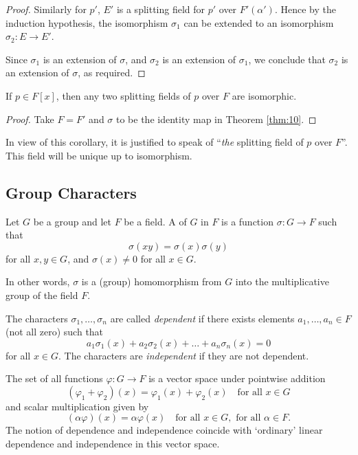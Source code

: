 \begin{theorem}
\begin{proof}
		Similarly for $p'$, $E'$ is a splitting field for $p'$ over $F'(\alpha')$. Hence by the induction hypothesis, the isomorphism $\sigma_1$ can be extended to an isomorphism $\sigma_2 : E \to E'$.
		
		Since $\sigma_1$ is an extension of $\sigma$, and $\sigma_2$ is an extension of $\sigma_1$, we conclude that $\sigma_2$ is an extension of $\sigma$, as required.
	\end{proof}
\end{theorem}

\begin{corollary}
	If $p \in F[x]$, then any two splitting fields of $p$ over $F$ are isomorphic.
	\begin{proof}
		Take $F = F'$ and $\sigma$ to be the identity map in Theorem \ref{thm:10}.
	\end{proof}
\end{corollary}

In view of this corollary, it is justified to speak of ``\emph{the} splitting field of $p$ over $F$''. This field will be unique up to isomorphism.

\subsection{Group Characters}
\begin{definition}
	Let $G$ be a group and let $F$ be a field. A  of $G$ in $F$ is a function $\sigma : G \to F$ such that
	\[
		\sigma(xy) = \sigma(x) \sigma(y)
	\]
	for all $x, y \in G$, and $\sigma(x) \neq 0$ for all $x \in G$.
	
	In other words, $\sigma$ is a (group) homomorphism from $G$ into the multiplicative group of the field $F$.
\end{definition}

\begin{definition}
	The characters $\sigma_1, \dots, \sigma_n$ are called \emph{dependent} if there exists elements $a_1, \dots, a_n \in F$ (not all zero) such that
	\[
		a_1 \sigma_1(x) + a_2 \sigma_2(x) + \dots + a_n \sigma_n(x) = 0
	\]
	for all $x \in G$. The characters are \emph{independent} if they are not dependent.
\end{definition}

\begin{note}
	The set of all functions $\varphi : G \to F$ is a vector space under pointwise addition
	\[
		(\varphi_1 + \varphi_2)(x) = \varphi_1(x) + \varphi_2(x) \quad \text{for all } x \in G
	\]
	and scalar multiplication given by
	\[
		(\alpha\varphi)(x) = \alpha\varphi(x) \quad \text{for all } x \in G, \text{ for all } \alpha \in F.
	\]
	The notion of dependence and independence coincide with `ordinary' linear dependence and independence in this vector space.
\end{note}

